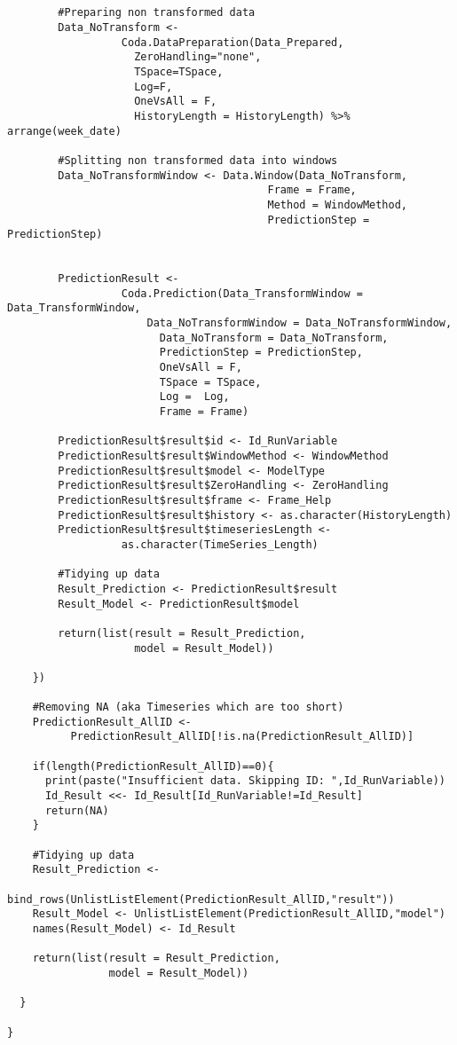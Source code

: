 \begin{verbatim}
        
        
        #Preparing non transformed data 
        Data_NoTransform <- 
				  Coda.DataPreparation(Data_Prepared,
					ZeroHandling="none",
					TSpace=TSpace,
					Log=F, 
					OneVsAll = F,
					HistoryLength = HistoryLength) %>% arrange(week_date)
					
        #Splitting non transformed data into windows
        Data_NoTransformWindow <- Data.Window(Data_NoTransform,
                                         Frame = Frame,
                                         Method = WindowMethod,
                                         PredictionStep = PredictionStep)
        
        
        PredictionResult <- 
				  Coda.Prediction(Data_TransformWindow = Data_TransformWindow,
					  Data_NoTransformWindow = Data_NoTransformWindow,
						Data_NoTransform = Data_NoTransform, 
						PredictionStep = PredictionStep,
						OneVsAll = F,
						TSpace = TSpace,
						Log =  Log, 
						Frame = Frame)
						
        PredictionResult$result$id <- Id_RunVariable
        PredictionResult$result$WindowMethod <- WindowMethod
        PredictionResult$result$model <- ModelType 
        PredictionResult$result$ZeroHandling <- ZeroHandling
        PredictionResult$result$frame <- Frame_Help
        PredictionResult$result$history <- as.character(HistoryLength)
        PredictionResult$result$timeseriesLength <- 
				  as.character(TimeSeries_Length)
        
        #Tidying up data
        Result_Prediction <- PredictionResult$result
        Result_Model <- PredictionResult$model
        
        return(list(result = Result_Prediction,
                    model = Result_Model))
        
    })
    
    #Removing NA (aka Timeseries which are too short)
    PredictionResult_AllID <- 
		  PredictionResult_AllID[!is.na(PredictionResult_AllID)]
    
    if(length(PredictionResult_AllID)==0){
      print(paste("Insufficient data. Skipping ID: ",Id_RunVariable))
      Id_Result <<- Id_Result[Id_RunVariable!=Id_Result]
      return(NA)
    }
    
    #Tidying up data
    Result_Prediction <- 
		  bind_rows(UnlistListElement(PredictionResult_AllID,"result"))
    Result_Model <- UnlistListElement(PredictionResult_AllID,"model")
    names(Result_Model) <- Id_Result
    
    return(list(result = Result_Prediction,
                model = Result_Model))
    
  }
  
}
\end{verbatim}
